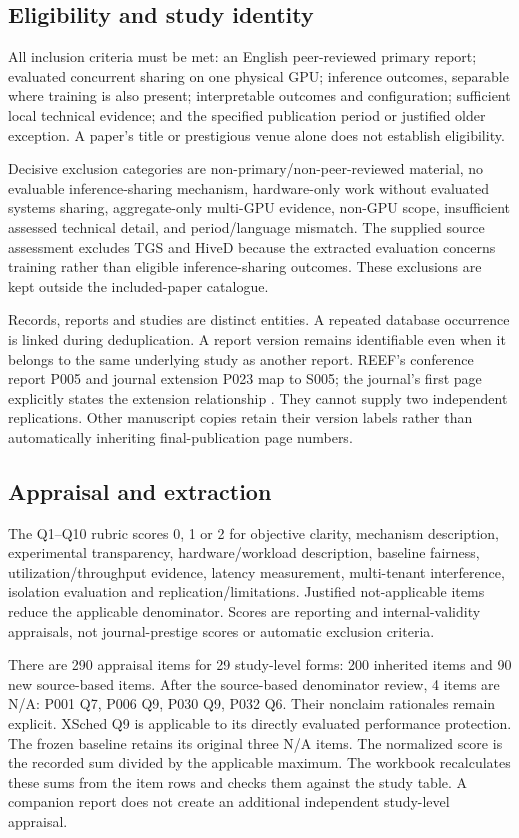 \subsection{Eligibility and study identity}
All inclusion criteria must be met: an English peer-reviewed primary report; evaluated concurrent sharing on one physical GPU; inference outcomes, separable where training is also present; interpretable outcomes and configuration; sufficient local technical evidence; and the specified publication period or justified older exception. A paper's title or prestigious venue alone does not establish eligibility.

Decisive exclusion categories are non-primary/non-peer-reviewed material, no evaluable inference-sharing mechanism, hardware-only work without evaluated systems sharing, aggregate-only multi-GPU evidence, non-GPU scope, insufficient assessed technical detail, and period/language mismatch. The supplied source assessment excludes TGS and HiveD because the extracted evaluation concerns training rather than eligible inference-sharing outcomes. These exclusions are kept outside the included-paper catalogue.

Records, reports and studies are distinct entities. A repeated database occurrence is linked during deduplication. A report version remains identifiable even when it belongs to the same underlying study as another report. REEF's conference report P005 and journal extension P023 map to S005; the journal's first page explicitly states the extension relationship \cite{P005,P023}. They cannot supply two independent replications. Other manuscript copies retain their version labels rather than automatically inheriting final-publication page numbers.

\subsection{Appraisal and extraction}
The Q1--Q10 rubric scores 0, 1 or 2 for objective clarity, mechanism description, experimental transparency, hardware/workload description, baseline fairness, utilization/throughput evidence, latency measurement, multi-tenant interference, isolation evaluation and replication/limitations. Justified not-applicable items reduce the applicable denominator. Scores are reporting and internal-validity appraisals, not journal-prestige scores or automatic exclusion criteria.

There are 290 appraisal items for 29 study-level forms: 200 inherited items and 90 new source-based items. After the source-based denominator review, 4 items are N/A: P001 Q7, P006 Q9, P030 Q9, P032 Q6. Their nonclaim rationales remain explicit. XSched Q9 is applicable to its directly evaluated performance protection. The frozen baseline retains its original three N/A items. The normalized score is the recorded sum divided by the applicable maximum. The workbook recalculates these sums from the item rows and checks them against the study table. A companion report does not create an additional independent study-level appraisal.

